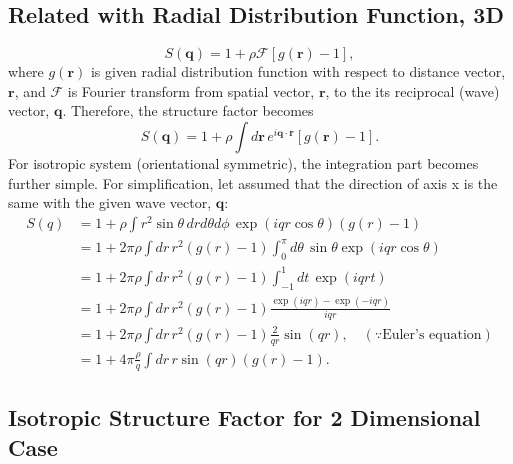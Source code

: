 \documentclass[10pt, a4paper]{report}
\begin{document}
\begin{appendices}
    \subsection{Related with Radial Distribution Function, 3D}
    \begin{equation}
      S(\mathbf{q}) = 1 + \rho\mathscr{F}\left[g(\mathbf{r}) - 1\right],
    \end{equation}
    where $g(\mathbf{r})$ is given radial distribution function with respect to distance vector, $\mathbf{r}$, and $\mathscr{F}$ is Fourier transform from spatial vector, $\mathbf{r}$, to the its reciprocal (wave) vector, $\mathbf{q}$. Therefore, the structure factor becomes
    \begin{equation}
      S(\mathbf{q}) = 1 + \rho \int d\mathbf{r}\, e^{i\mathbf{q}\cdot\mathbf{r}}\left[g(\mathbf{r}) - 1\right].
    \end{equation}
    For isotropic system (orientational symmetric), the integration part becomes further simple. For simplification, let assumed that the direction of axis x is the same with the given wave vector, $\mathbf{q}$:
    \begin{align}
      S(q) &= 1 + \rho \int r^2\sin\theta \,dr d\theta d\phi\, \exp(iqr\cos\theta)(g(r) - 1)  \nonumber\\
           &= 1 + 2\pi\rho \int dr \,r^2(g(r) - 1) \int_0^{\pi} d\theta \,\sin\theta\exp\left(iqr\cos\theta\right) \nonumber\\
           &= 1 + 2\pi \rho \int dr \,r^2(g(r) - 1) \int_{-1}^{1}dt \,\exp(iqrt) \nonumber\\
           &= 1 + 2\pi \rho \int dr \,r^2(g(r) - 1) \frac{\exp(iqr)-\exp(-iqr)}{iqr} \nonumber\\
           &= 1 + 2\pi \rho \int dr \,r^2(g(r) - 1) \frac{2}{qr}\sin(qr), \quad(\because\textrm{Euler's equation})\nonumber\\
           &= 1 + 4\pi \frac{\rho}{q} \int dr \,r\sin(qr)(g(r) - 1).
    \end{align}

    \subsection{Isotropic Structure Factor for 2 Dimensional Case}


\end{appendices}
\end{document}
